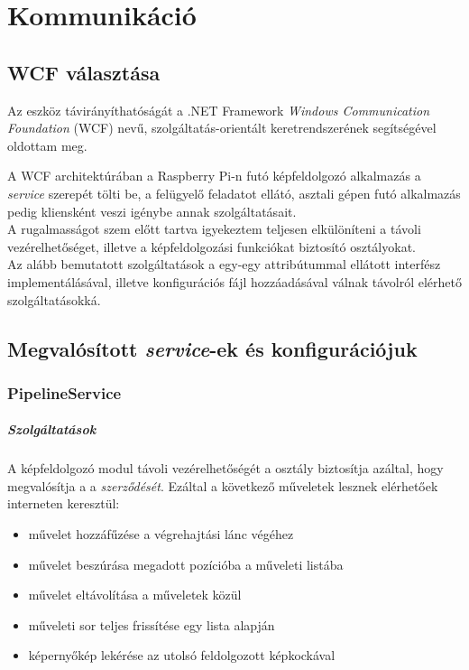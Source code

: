 \chapter{Kommunikáció} \label{chapter:kommunikacio}
\section{WCF választása}
Az eszköz távirányíthatóságát a .NET Framework \emph{Windows Communication Foundation} (WCF) nevű, szolgáltatás-orientált keretrendszerének segítségével oldottam meg. 

 A WCF architektúrában a Raspberry Pi-n futó képfeldolgozó alkalmazás a \textit{service} szerepét tölti be, a felügyelő feladatot ellátó, asztali gépen futó alkalmazás pedig kliensként veszi igénybe annak szolgáltatásait.\\
A rugalmasságot szem előtt tartva igyekeztem teljesen elkülöníteni a távoli vezérelhetőséget, illetve a képfeldolgozási funkciókat biztosító osztályokat.\\
Az alább bemutatott szolgáltatások a egy-egy  attribútummal ellátott interfész implementálásával, illetve konfigurációs fájl hozzáadásával válnak távolról elérhető szolgáltatásokká.

\section{Megvalósított \emph{service}-ek és konfigurációjuk}
\subsection{PipelineService}

\paragraph{Szolgáltatások}
A képfeldolgozó modul távoli vezérelhetőségét a  osztály biztosítja azáltal, hogy megvalósítja a a  \textit{szerződését}. Ezáltal a következő műveletek lesznek elérhetőek interneten keresztül:
\begin{itemize}
\item művelet hozzáfűzése a végrehajtási lánc végéhez
\item művelet beszúrása megadott pozícióba a műveleti listába
\item művelet eltávolítása a műveletek közül
\item műveleti sor teljes frissítése egy lista alapján
\item képernyőkép lekérése az utolsó feldolgozott képkockával
\end{itemize}

